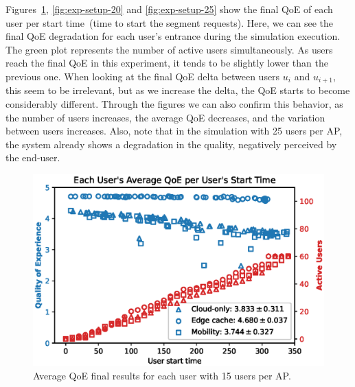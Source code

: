 Figures~\ref{fig:exp-setup-15}, \ref{fig:exp-setup-20} and \ref{fig:exp-setup-25} show the final QoE of each user per start time~(time to start the segment requests). Here, we can see the final QoE degradation for each user's entrance during the simulation execution. The green plot represents the number of active users simultaneously.  
As users reach the final QoE in this experiment, it tends to be slightly lower than the previous one. When looking at the final QoE delta between users $u_{i}$ and $u_{i + 1}$, this seem to be irrelevant, but as we increase the delta, the QoE starts to become considerably different. Through the figures we can also confirm this behavior, as the number of users increases, the average QoE decreases, and the variation between users increases. Also, note that in the simulation with 25 users per AP, the system already shows a degradation in the quality, negatively perceived by the end-user.

\begin{figure}[!h]
    \centering
    \includegraphics[width=\linewidth]{images/UserQoExUserStartTime15users.eps}
    \vspace{-0.7cm}
    \caption{Average QoE final results for each user with 15 users per AP.}
    \label{fig:exp-setup-15}
\end{figure}

